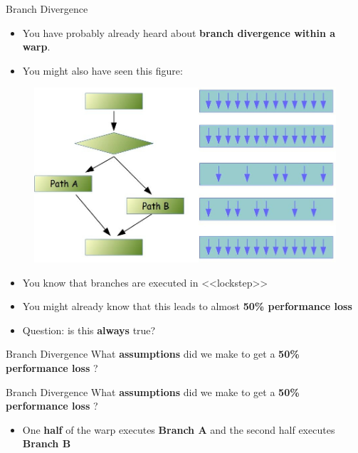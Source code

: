 \documentclass[9pt]{beamer}
\newcommand{\emphasize}[1]{\textbf{\color{red} #1 } }
\begin{document}
\begin{frame}[t]{Branch Divergence }
\begin{itemize}
\item You have probably already heard about \textbf{branch divergence within a warp}.
\item You might also have seen this figure: \\
\end{itemize}
\begin{figure}
\includegraphics[scale=0.22]{images/bd-1.jpg}
\centering
\end{figure}
\begin{itemize}
\item You know that branches are executed in <<lockstep>>
\item You might already know that this leads to almost \emphasize{50\% performance loss}
\item Question: is this \textbf{always} true?
\end{itemize}
\end{frame}


\begin{frame}[t]{Branch Divergence }
What \textbf{assumptions} did we make to get a \emphasize{50\% performance loss}?
\end{frame}

\begin{frame}[t]{Branch Divergence }
What \textbf{assumptions} did we make to get a \emphasize{50\% performance loss}?
\begin{itemize}
\item One \textbf{half} of the warp executes \textbf{Branch A} and the second half executes \\ \textbf{Branch B}
\end{itemize}
\end{frame}
\end{document}
